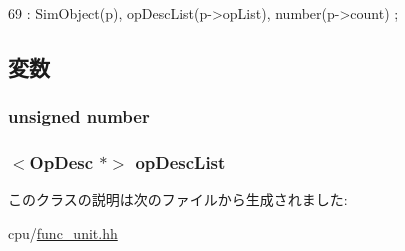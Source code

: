 \begin{DoxyCode}
69         : SimObject(p), opDescList(p->opList), number(p->count) {};
\end{DoxyCode}


\subsection{変数}
\hypertarget{classFUDesc_a99cb6782c65a84255b51bea9221f5103}{
\subsubsection[{number}]{\setlength{\rightskip}{0pt plus 5cm}unsigned {\bf number}}}
\label{classFUDesc_a99cb6782c65a84255b51bea9221f5103}
\hypertarget{classFUDesc_a809cc674850ff0356936a004fbfac059}{
\subsubsection[{opDescList}]{$<${\bf OpDesc} $\ast$$>$ {\bf opDescList}}}
\label{classFUDesc_a809cc674850ff0356936a004fbfac059}


このクラスの説明は次のファイルから生成されました:\begin{DoxyCompactItemize}
\item 
cpu/\hyperlink{func__unit_8hh}{func\_\-unit.hh}\end{DoxyCompactItemize}
